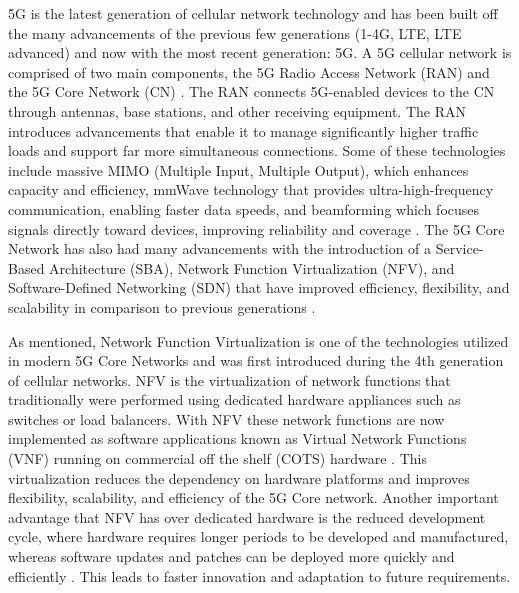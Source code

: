 \documentclass[final,1p,times,authoryear]{elsarticle}
\begin{document}
\vspace{1em}

5G is the latest generation of cellular network technology and has been built off the many advancements of the previous few generations (1-4G, LTE, LTE advanced) and now with the most recent generation: 5G. A 5G cellular network is comprised of two main components, the 5G Radio Access Network (RAN) and the 5G Core Network (CN) \citep{cardoso2020softwarized}. The RAN connects 5G-enabled devices to the CN through antennas, base stations, and other receiving equipment. The RAN introduces advancements that enable it to manage significantly higher traffic loads and support far more simultaneous connections. Some of these technologies include massive MIMO (Multiple Input, Multiple Output), which enhances capacity and efficiency, mmWave technology that provides ultra-high-frequency communication, enabling faster data speeds, and beamforming which focuses signals directly toward devices, improving reliability and coverage \citep{smith2023example}. The 5G Core Network has also had many advancements with the introduction of a Service-Based Architecture (SBA), Network Function Virtualization (NFV), and Software-Defined Networking (SDN) that have improved efficiency, flexibility, and scalability in comparison to previous generations \citep{condoluci2018softwarization}.

\vspace{1em}

As mentioned, Network Function Virtualization is one of the technologies utilized in modern 5G Core Networks and was first introduced during the 4th generation of cellular networks. NFV is the virtualization of network functions that traditionally were performed using dedicated hardware appliances such as switches or load balancers. With NFV these network functions are now implemented as software applications known as Virtual Network Functions (VNF) running on commercial off the shelf (COTS) hardware \citep{sharevski2018towards}. This virtualization reduces the dependency on hardware platforms and improves flexibility, scalability, and efficiency of the 5G Core network. Another important advantage that NFV has over dedicated hardware is the reduced development cycle, where hardware requires longer periods to be developed and manufactured, whereas software updates and patches can be deployed more quickly and efficiently \citep{condoluci2018softwarization}. This leads to faster innovation and adaptation to future requirements.

\vspace{1em}
\end{document}
